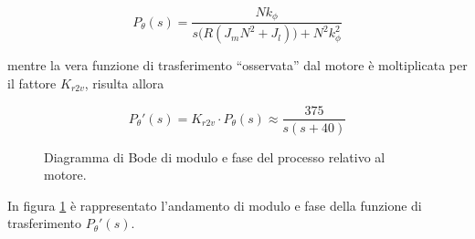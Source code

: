 \documentclass[english]{article}
\begin{document}
		\begin{equation}
			P_{\theta}(s) = 
			\frac{Nk_{\phi}}{s\bigl( R(J_mN^2+J_l) \bigl) + N^2k_{\phi}^2}
			\label{eq:FunzioneTrasferimentoComplessiva}
		\end{equation}
		
		\noindent mentre la vera funzione di trasferimento ``osservata'' dal motore è moltiplicata per il fattore $K_{r2v}$, risulta allora
		
		\begin{equation*}
			P_{\theta}'(s)= K_{r2v}\cdot P_{\theta}(s) \approx \frac{375}{s(s+40)}
		\end{equation*}
		
		\begin{figure}[H]
			\centering
			\label{subfig:diagrammaBode} \quad
			\label{subfig:mappaZeriPoli}
			\caption{Diagramma di Bode di modulo e fase del processo relativo al motore.}
			\label{fig:diagrammiMotore}
		\end{figure}	
		
		\noindent In figura \ref{fig:diagrammiMotore} è rappresentato l'andamento di modulo e fase della funzione di trasferimento $P_{\theta}'(s)$.
		
\end{document}
